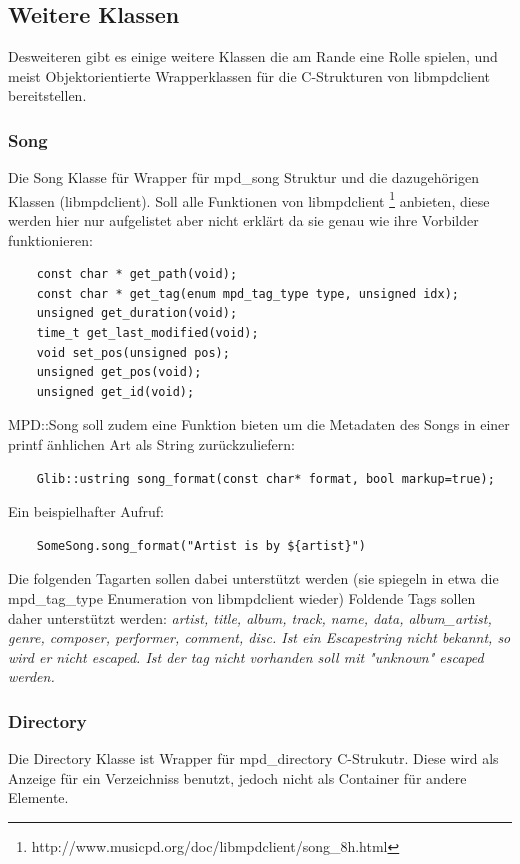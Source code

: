 \subsection{Weitere Klassen}
Desweiteren gibt es einige weitere Klassen die am Rande eine Rolle spielen,
und meist Objektorientierte Wrapperklassen für die C-Strukturen von libmpdclient bereitstellen.

\subsubsection{Song}

Die Song Klasse für Wrapper für mpd\_song Struktur und die dazugehörigen Klassen (libmpdclient).
Soll alle Funktionen von libmpdclient \footnote{http://www.musicpd.org/doc/libmpdclient/song\_8h.html} anbieten,
diese werden hier nur aufgelistet aber nicht erklärt da sie genau wie ihre Vorbilder funktionieren:

\begin{verbatim}
    const char * get_path(void);
    const char * get_tag(enum mpd_tag_type type, unsigned idx);
    unsigned get_duration(void);
    time_t get_last_modified(void);
    void set_pos(unsigned pos);
    unsigned get_pos(void);
    unsigned get_id(void);
\end{verbatim}

MPD::Song soll zudem eine Funktion bieten um die Metadaten des Songs in einer printf änhlichen Art als String zurückzuliefern:
\begin{verbatim}
    Glib::ustring song_format(const char* format, bool markup=true);
\end{verbatim}

Ein beispielhafter Aufruf:
\begin{verbatim}
    SomeSong.song_format("Artist is by ${artist}") 
\end{verbatim}

Die folgenden Tagarten sollen dabei unterstützt werden (sie spiegeln in etwa die mpd\_tag\_type Enumeration von libmpdclient wieder)
Foldende Tags sollen daher unterstützt werden: \it artist, title, album, track, name, data, album\_artist, genre, composer, performer, comment, disc\rm.
Ist ein Escapestring nicht bekannt, so wird er nicht escaped. Ist der tag nicht vorhanden soll mit "unknown" escaped werden.


\subsubsection{Directory}
Die Directory Klasse ist Wrapper für mpd\_directory C-Strukutr. Diese wird als Anzeige für ein Verzeichniss benutzt,
jedoch nicht als Container für andere Elemente.


